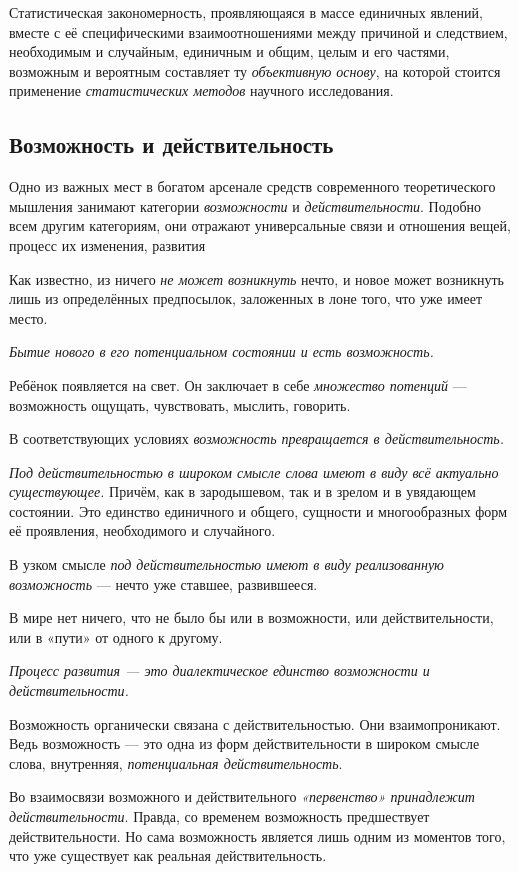 \documentclass[a4paper,14pt,russian]{extreport}
\begin{document}
Статистическая закономерность, проявляющаяся в массе единичных явлений, вместе с её специфическими взаимоотношениями между причиной и следствием, необходимым и случайным, единичным и общим, целым и его частями, возможным и вероятным составляет ту \emph{объективную основу}, на которой стоится применение \emph{статистических методов} научного исследования.

\subsection{Возможность и действительность}

Одно из важных мест в богатом арсенале средств современного теоретического мышления занимают категории \emph{возможности} и \emph{действительности}. Подобно всем другим категориям, они отражают универсальные связи и отношения вещей, процесс их изменения, развития

Как известно, из ничего \emph{не может возникнуть} нечто, и новое может возникнуть лишь из определённых предпосылок, заложенных в лоне того, что уже имеет место.

\emph{Бытие нового в его потенциальном состоянии и есть возможность.}

Ребёнок появляется на свет. Он заключает в себе \emph{множество потенций} --- возможность ощущать, чувствовать, мыслить, говорить.

В соответствующих условиях \emph{возможность превращается в действительность.}

\emph{Под действительностью в широком смысле слова имеют в виду всё актуально существующее.} Причём, как в зародышевом, так и в зрелом и в увядающем состоянии. Это единство единичного и общего, сущности и многообразных форм её проявления, необходимого и случайного.

В узком смысле \emph{под действительностью имеют в виду реализованную возможность} --- нечто уже ставшее, развившееся.

В мире нет ничего, что не было бы или в возможности, или действительности, или в «пути» от одного к другому.

\emph{Процесс развития --- это диалектическое единство возможности и действительности.}

Возможность органически связана с действительностью. Они взаимопроникают. Ведь возможность --- это одна из форм действительности в широком смысле слова, внутренняя, \emph{потенциальная действительность}.

Во взаимосвязи возможного и действительного \emph{«первенство» принадлежит действительности}. Правда, со временем возможность предшествует действительности. Но сама возможность является лишь одним из моментов того, что уже существует как реальная действительность.
\end{document}
